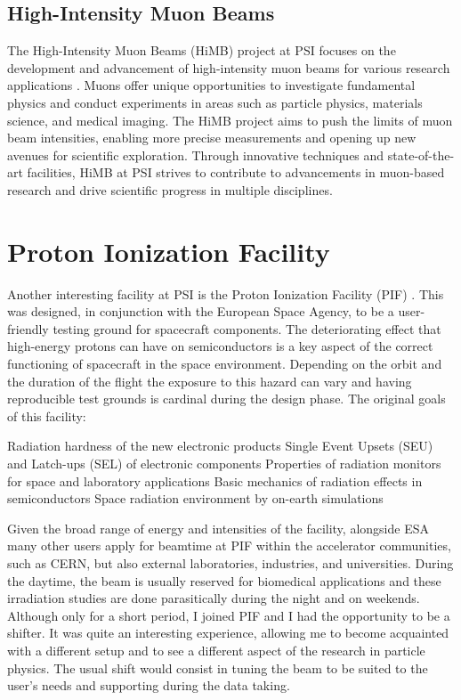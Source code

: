 \begin{refsection}
    \subsection{High-Intensity Muon Beams}
    The High-Intensity Muon Beams (HiMB) project at PSI focuses on the development and advancement of high-intensity muon beams for various research applications \cite{HIMB:2021}\cite{HIMB:gio}.
    Muons offer unique opportunities to investigate fundamental physics and conduct experiments in areas such as particle physics, materials science, and medical imaging. 
    The HiMB project aims to push the limits of muon beam intensities, enabling more precise measurements and opening up new avenues for scientific exploration.
    Through innovative techniques and state-of-the-art facilities, HiMB at PSI strives to contribute to advancements in muon-based research and drive scientific progress in multiple disciplines.
    
\section{Proton Ionization Facility}
    Another interesting facility at PSI is the Proton Ionization Facility (PIF) \cite{PIF:1996}\cite{PIF:2001}.
    This was designed, in conjunction with the European Space Agency, to be a user-friendly testing ground for spacecraft components.
    The deteriorating effect that high-energy protons can have on semiconductors is a key aspect of the correct functioning of spacecraft in the space environment.
    Depending on the orbit and the duration of the flight the exposure to this hazard can vary and having reproducible test grounds is cardinal during the design phase. 
    The original goals of this facility:
    \begin{outline}
        \1 Radiation hardness of the new electronic products
        \1 Single Event Upsets (SEU) and Latch-ups (SEL) of electronic components
        \1 Properties of radiation monitors for space and laboratory applications
        \1 Basic mechanics of radiation effects in semiconductors
        \1 Space radiation environment by on-earth simulations
    \end{outline}
    Given the broad range of energy and intensities of the facility, alongside ESA many other users apply for beamtime at PIF within the accelerator communities, such as CERN, but also external laboratories, industries, and universities.
    During the daytime, the beam is usually reserved for biomedical applications and these irradiation studies are done parasitically during the night and on weekends.
    Although only for a short period, I joined PIF and I had the opportunity to be a shifter. 
    It was quite an interesting experience, allowing me to become acquainted with a different setup and to see a different aspect of the research in particle physics.
    The usual shift would consist in tuning the beam to be suited to the user's needs and supporting during the data taking.

\printbibliography[
    heading = bibliographychapter,
    title=Bibliography for the introduction
]

\end{refsection}